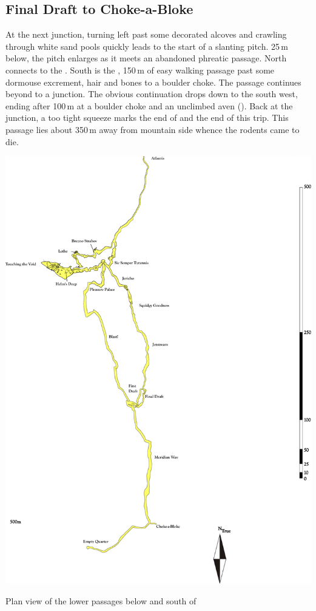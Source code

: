 \subsection{Final Draft to Choke-a-Bloke}
At the next junction, turning left past some decorated alcoves and crawling through white sand pools quickly leads to the start of a slanting pitch. 25\,m below, the pitch enlarges as it meets an abandoned phreatic passage. North connects to the . South is the , 150\,m of easy walking passage past some dormouse excrement, hair and bones to a boulder choke. The passage continues beyond to a junction. The obvious continuation drops down to the south west, ending after 100\,m at a boulder choke and an unclimbed aven (). Back at the junction, a too tight squeeze marks the end of  and the end of this trip. This passage lies about 350\,m away from mountain side whence the rodents came to die.

\begin{pagesurvey}
\checkoddpage \ifoddpage \forcerectofloat \else \forceversofloat \fi
\centering
\includegraphics[width=\textwidth]{images/pdf_maps/paradisesouth.pdf}
\caption[Below Stuck in Paradise]{Plan view of the lower passages below and south of \protect{}}
\label{paradise}
\end{pagesurvey}